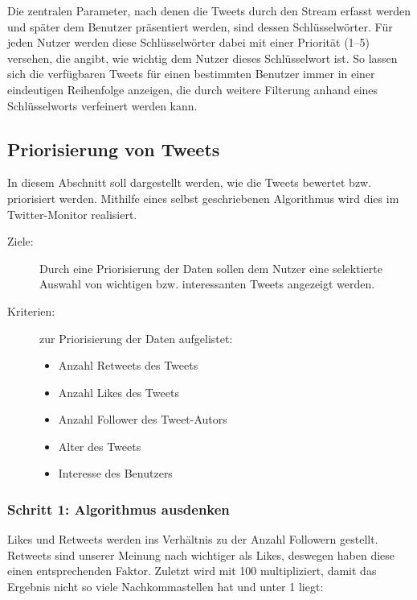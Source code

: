 Die zentralen Parameter, nach denen die Tweets durch den Stream erfasst werden und später dem
Benutzer präsentiert werden, sind dessen Schlüsselwörter. Für jeden Nutzer werden diese
Schlüsselwörter dabei mit einer Priorität (1–5) versehen, die angibt, wie wichtig dem Nutzer dieses
Schlüsselwort ist. So lassen sich die verfügbaren Tweets für einen bestimmten Benutzer immer in
einer eindeutigen Reihenfolge anzeigen, die durch weitere Filterung anhand eines Schlüsselworts
verfeinert werden kann.

\subsection{Priorisierung von Tweets}

In diesem Abschnitt soll dargestellt werden, wie die Tweets bewertet bzw. priorisiert 
werden. Mithilfe eines selbst geschriebenen Algorithmus wird dies im Twitter-Monitor 
realisiert. 
\begin{description}
	\item [Ziele:] Durch eine Priorisierung der Daten sollen dem Nutzer eine selektierte Auswahl von wichtigen bzw. interessanten Tweets angezeigt werden. 
	\item [Kriterien:] zur Priorisierung der Daten aufgelistet:
	\begin{itemize}
		\item Anzahl Retweets des Tweets 
		\item Anzahl Likes des Tweets
		\item Anzahl Follower des Tweet-Autors
		\item Alter des Tweets
		\item Interesse des Benutzers
	\end{itemize}
\end{description}

\subsubsection*{Schritt 1: Algorithmus ausdenken}

Likes und Retweets werden ins Verhältnis zu der Anzahl Followern gestellt. Retweets sind 
unserer Meinung nach wichtiger als Likes, deswegen haben diese einen entsprechenden 
Faktor. Zuletzt wird mit 100 multipliziert, damit das Ergebnis nicht so viele 
Nachkommastellen hat und unter 1 liegt:
 
